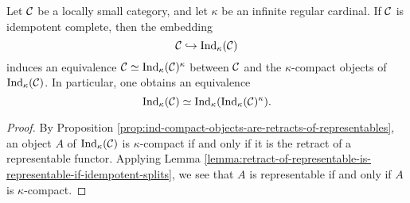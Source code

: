 \begin{proposition}
	Let \(\mathcal{C}\) be a locally small category, and let \(\kappa\) be an infinite regular cardinal. If \(\mathcal{C}\) is idempotent complete, then the embedding
	\[ \mathcal{C}\hookrightarrow\operatorname{Ind}_\kappa(\mathcal{C}) \]
	induces an equivalence \(\mathcal{C}\simeq\operatorname{Ind}_\kappa(\mathcal{C})^\kappa\) between \(\mathcal{C}\) and the \(\kappa\)-compact objects of \(\operatorname{Ind}_\kappa(\mathcal{C})\). In particular, one obtains an equivalence
	\[ \operatorname{Ind}_\kappa(\mathcal{C}) \simeq \operatorname{Ind}_\kappa(\operatorname{Ind}_\kappa(\mathcal{C})^\kappa). \]
\end{proposition}
\begin{proof}
By Proposition \ref{prop:ind-compact-objects-are-retracts-of-representables}, an object \(A\) of \(\operatorname{Ind}_\kappa(\mathcal{C})\) is \(\kappa\)-compact if and only if it is the retract of a representable functor.
Applying Lemma \ref{lemma:retract-of-representable-is-representable-if-idempotent-splits}, we see that \(A\) is representable if and only if \(A\) is \(\kappa\)-compact.
\end{proof}


